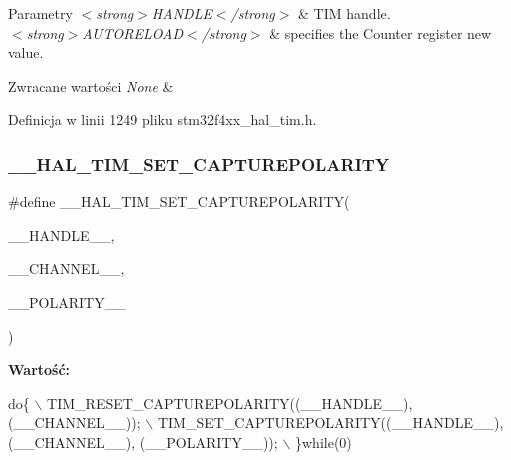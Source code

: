\begin{DoxyParams}{Parametry}
{\em $<$strong$>$\+H\+A\+N\+D\+L\+E$<$/strong$>$} & T\+IM handle. \\
\hline
{\em $<$strong$>$\+A\+U\+T\+O\+R\+E\+L\+O\+A\+D$<$/strong$>$} & specifies the Counter register new value. \\
\hline
\end{DoxyParams}

\begin{DoxyRetVals}{Zwracane wartości}
{\em None} & \\
\hline
\end{DoxyRetVals}


Definicja w linii 1249 pliku stm32f4xx\+\_\+hal\+\_\+tim.\+h.

\mbox{\label{group___t_i_m___exported___macros_gac5d6989516caa67fae23a9329228cdc7}} 
\subsubsection{\texorpdfstring{\+\_\+\+\_\+\+H\+A\+L\+\_\+\+T\+I\+M\+\_\+\+S\+E\+T\+\_\+\+C\+A\+P\+T\+U\+R\+E\+P\+O\+L\+A\+R\+I\+TY}{\_\_HAL\_TIM\_SET\_CAPTUREPOLARITY}}
{\footnotesize\ttfamily \#define \+\_\+\+\_\+\+H\+A\+L\+\_\+\+T\+I\+M\+\_\+\+S\+E\+T\+\_\+\+C\+A\+P\+T\+U\+R\+E\+P\+O\+L\+A\+R\+I\+TY(\begin{DoxyParamCaption}\item[{}]{\+\_\+\+\_\+\+H\+A\+N\+D\+L\+E\+\_\+\+\_\+,  }\item[{}]{\+\_\+\+\_\+\+C\+H\+A\+N\+N\+E\+L\+\_\+\+\_\+,  }\item[{}]{\+\_\+\+\_\+\+P\+O\+L\+A\+R\+I\+T\+Y\+\_\+\+\_\+ }\end{DoxyParamCaption})}

{\bfseries Wartość\+:}
\begin{DoxyCode}
\textcolor{keywordflow}{do}\{                                                                     \(\backslash\)
    TIM\_RESET\_CAPTUREPOLARITY((\_\_HANDLE\_\_), (\_\_CHANNEL\_\_));               \(\backslash\)
    TIM\_SET\_CAPTUREPOLARITY((\_\_HANDLE\_\_), (\_\_CHANNEL\_\_), (\_\_POLARITY\_\_)); \(\backslash\)
  \}\textcolor{keywordflow}{while}(0)
\end{DoxyCode}


